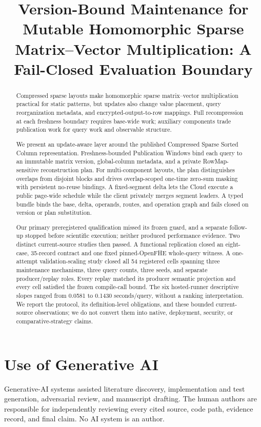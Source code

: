\documentclass[version=submission]{iacrcc}
\title[
  running = {Version-Bound Mutable Homomorphic SpMV},
]{Version-Bound Maintenance for Mutable Homomorphic Sparse Matrix--Vector
Multiplication: A Fail-Closed Evaluation Boundary}
\begin{document}
\maketitle


\begin{abstract}
Compressed sparse layouts make homomorphic sparse matrix--vector multiplication
practical for static patterns, but updates also change value placement, query
reorganization metadata, and encrypted-output-to-row mappings. Full
recompression at each freshness boundary requires base-wide work; auxiliary
components trade publication work for query work and observable structure.

We present an update-aware layer around the published Compressed Sparse Sorted
Column representation. Freshness-bounded Publication Windows bind each query to
an immutable matrix version, global-column metadata, and a private
RowMap-sensitive reconstruction plan. For multi-component layouts, the plan
distinguishes overlaps from disjoint blocks and drives overlap-scoped one-time
zero-sum masking with persistent no-reuse bindings. A fixed-segment delta lets
the Cloud execute a public page-wide schedule while the client privately merges
segment leaders. A typed bundle binds the base, delta, operands, routes, and
operation graph and fails closed on version or plan substitution.

Our primary preregistered qualification missed its frozen guard, and a separate
follow-up stopped before scientific execution; neither produced performance
evidence. Two distinct current-source studies then passed. A functional
replication closed an eight-case, 35-record contract and one fixed
pinned-OpenFHE whole-query witness. A one-attempt validation-scaling study
closed all 54 registered cells spanning three maintenance mechanisms, three
query counts, three seeds, and separate producer/replay roles. Every replay
matched its producer semantic projection and every cell satisfied the frozen
compile-call bound. The six hosted-runner descriptive slopes ranged from
0.0581 to 0.1430 seconds/query, without a ranking interpretation. We report the
protocol, its definition-level obligations, and these bounded current-source
observations; we do not convert them into native, deployment, security, or
comparative-strategy claims.
\end{abstract}



\section*{Use of Generative AI}
Generative-AI systems assisted literature discovery, implementation and test
generation, adversarial review, and manuscript drafting. The human authors are
responsible for independently reviewing every cited source, code path, evidence
record, and final claim. No AI system is an author.


\end{document}
